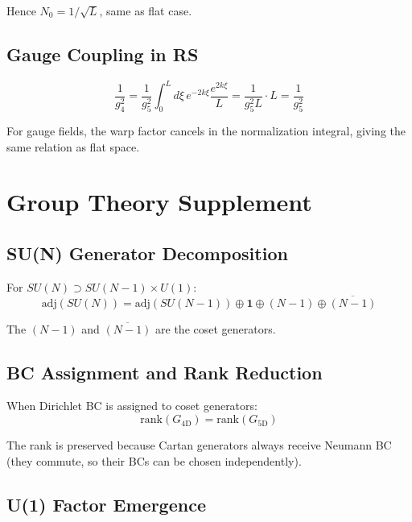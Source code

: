 \documentclass[11pt,a4paper]{article}
\begin{document}
Hence $N_0 = 1/\sqrt{L}$, same as flat case.

\subsection{Gauge Coupling in RS}

\begin{equation}
  \frac{1}{g_4^2} = \frac{1}{g_5^2} \int_0^L d\xi \, e^{-2k\xi} \frac{e^{2k\xi}}{L}
                  = \frac{1}{g_5^2 L} \cdot L = \frac{1}{g_5^2}
  \label{eq:g4-rs}
\end{equation}

For gauge fields, the warp factor cancels in the normalization integral,
giving the same relation as flat space.

\section{Group Theory Supplement}
\label{app:group}

\subsection{SU(N) Generator Decomposition}

For $SU(N) \supset SU(N-1) \times U(1)$:
\begin{equation}
  \text{adj}(SU(N)) = \text{adj}(SU(N-1)) \oplus \mathbf{1} \oplus (N-1) \oplus \overline{(N-1)}
  \label{eq:sun-decomp}
\end{equation}

The $(N-1)$ and $\overline{(N-1)}$ are the coset generators.

\subsection{BC Assignment and Rank Reduction}

When Dirichlet BC is assigned to coset generators:
\begin{equation}
  \text{rank}(G_{\text{4D}}) = \text{rank}(G_{\text{5D}})
  \label{eq:rank-preserved}
\end{equation}

The rank is preserved because Cartan generators always receive Neumann BC
(they commute, so their BCs can be chosen independently).

\subsection{U(1) Factor Emergence}
\end{document}
